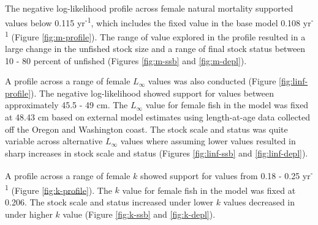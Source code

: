 \documentclass[11pt,
  english,
  a4paper,
]{article}
\begin{document}

The negative log-likelihood profile across female natural mortality supported values below 0.115 yr\textsuperscript{-1}, which includes the fixed value in the base model 0.108 yr\textsuperscript{-1} (Figure \ref{fig:m-profile}). The range of value explored in the profile resulted in a large change in the unfished stock size and a range of final stock status between 10 - 80 percent of unfished (Figures \ref{fig:m-ssb} and \ref{fig:m-depl}).

\leavevmode\tagmcend\tagstructend\par


A profile across a range of female {\(L_{\infty}\)\leavevmode\tagmcend\tagstructend} values was also conducted (Figure \ref{fig:linf-profile}). The negative log-likelihood showed support for values between approximately 45.5 - 49 cm. The {\(L_{\infty}\)\leavevmode\tagmcend\tagstructend} value for female fish in the model was fixed at 48.43 cm based on external model estimates using length-at-age data collected off the Oregon and Washington coast. The stock scale and status was quite variable across alternative {\(L_{\infty}\)\leavevmode\tagmcend\tagstructend} values where assuming lower values resulted in sharp increases in stock scale and status (Figures \ref{fig:linf-ssb} and \ref{fig:linf-depl}).

\leavevmode\tagmcend\tagstructend\par


A profile across a range of female {\(k\)\leavevmode\tagmcend\tagstructend} showed support for values from 0.18 - 0.25 yr\textsuperscript{-1} (Figure \ref{fig:k-profile}). The {\(k\)\leavevmode\tagmcend\tagstructend} value for female fish in the model was fixed at 0.206. The stock scale and status increased under lower {\(k\)\leavevmode\tagmcend\tagstructend} values decreased in under higher {\(k\)\leavevmode\tagmcend\tagstructend} value (Figure \ref{fig:k-ssb} and \ref{fig:k-depl}).
\end{document}
